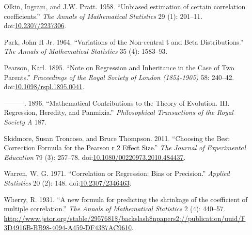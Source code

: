 \documentclass[]{article}
\begin{document}
\hypertarget{ref-Olkin1958}{}
Olkin, Ingram, and J.W. Pratt. 1958. ``Unbiased estimation of certain
correlation coefficients.'' \emph{The Annals of Mathematical Statistics}
29 (1): 201--11.
doi:\href{https://doi.org/10.2307/2237306}{10.2307/2237306}.

\hypertarget{ref-Park1964}{}
Park, John H Jr. 1964. ``Variations of the Non-central t and Beta
Distributions.'' \emph{The Annals of Mathematical Statistics} 35 (4):
1583--93.

\hypertarget{ref-Pearson1895}{}
Pearson, Karl. 1895. ``Note on Regression and Inheritance in the Case of
Two Parents.'' \emph{Proceedings of the Royal Society of London
(1854-1905)} 58: 240--42.
doi:\href{https://doi.org/10.1098/rspl.1895.0041}{10.1098/rspl.1895.0041}.

\hypertarget{ref-Pearson1896}{}
---------. 1896. ``Mathematical Contributions to the Theory of
Evolution. III. Regression, Heredity, and Panmixia.''
\emph{Philosophical Transactions of the Royal Society A} 187.

\hypertarget{ref-Skidmore2011}{}
Skidmore, Susan Troncoso, and Bruce Thompson. 2011. ``Choosing the Best
Correction Formula for the Pearson r 2 Effect Size.'' \emph{The Journal
of Experimental Education} 79 (3): 257--78.
doi:\href{https://doi.org/10.1080/00220973.2010.484437}{10.1080/00220973.2010.484437}.

\hypertarget{ref-Warren1971}{}
Warren, W. G. 1971. ``Correlation or Regression: Bias or Precision.''
\emph{Applied Statistics} 20 (2): 148.
doi:\href{https://doi.org/10.2307/2346463}{10.2307/2346463}.

\hypertarget{ref-Wherry1931}{}
Wherry, R. 1931. ``A new formula for predicting the shrinkage of the
coefficient of multiple correlation.'' \emph{The Annals of Mathematical
Statistics} 2 (4): 440--57.
\url{http://www.jstor.org/stable/2957681$/backslash$npapers2://publication/uuid/F3D4916B-BB98-4094-A459-DF4387AC9610}.
\end{document}
